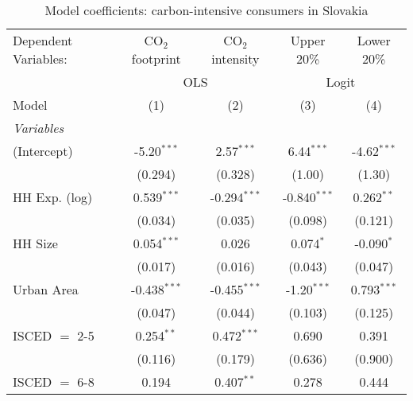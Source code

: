 
\begin{table}[htbp!]
   \centering
   \small
   \begin{adjustbox}{width = 1\textwidth, max height = 0.95\textheight, center}
      \begin{threeparttable}[b]
         \caption{\label{tab:Logit_1_SVK} Model coefficients: carbon-intensive consumers in Slovakia}
         \begin{tabular}{lcccc}
            \tabularnewline \midrule \midrule
            Dependent Variables: & CO$_{2}$ footprint & CO$_{2}$ intensity & Upper 20\%     & Lower 20\%\\   
             & \multicolumn{2}{c}{OLS} & \multicolumn{2}{c}{Logit} \\ 
            Model                & (1)                & (2)                & (3)            & (4)\\  
            \midrule
            \emph{Variables}\\
            (Intercept)          & -5.20$^{***}$      & 2.57$^{***}$       & 6.44$^{***}$   & -4.62$^{***}$\\   
                                 & (0.294)            & (0.328)            & (1.00)         & (1.30)\\   
            HH Exp. (log)        & 0.539$^{***}$      & -0.294$^{***}$     & -0.840$^{***}$ & 0.262$^{**}$\\   
                                 & (0.034)            & (0.035)            & (0.098)        & (0.121)\\   
            HH Size              & 0.054$^{***}$      & 0.026              & 0.074$^{*}$    & -0.090$^{*}$\\   
                                 & (0.017)            & (0.016)            & (0.043)        & (0.047)\\   
            Urban Area           & -0.438$^{***}$     & -0.455$^{***}$     & -1.20$^{***}$  & 0.793$^{***}$\\   
                                 & (0.047)            & (0.044)            & (0.103)        & (0.125)\\   
            ISCED $=$ 2-5        & 0.254$^{**}$       & 0.472$^{***}$      & 0.690          & 0.391\\   
                                 & (0.116)            & (0.179)            & (0.636)        & (0.900)\\   
            ISCED $=$ 6-8        & 0.194              & 0.407$^{**}$       & 0.278          & 0.444\\   

\end{tabular}
\end{threeparttable}
\end{adjustbox}
\end{table}
